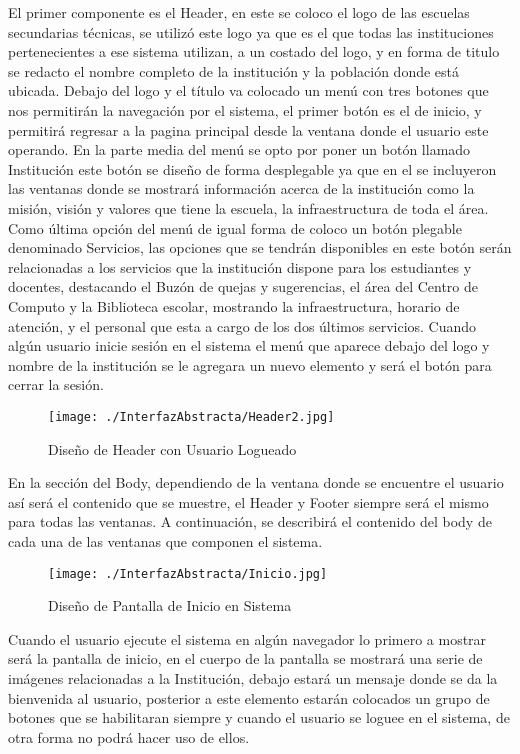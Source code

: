 {\large El primer componente es el Header, en este se coloco el logo de las escuelas secundarias técnicas, se utilizó este logo ya que es el que todas las instituciones pertenecientes a ese sistema utilizan, a un costado del logo, y en forma de titulo se redacto el nombre completo de la institución y la población donde está ubicada.
Debajo del logo y el título va colocado un menú con tres botones que nos permitirán la navegación por el sistema, el primer botón es el de inicio, y permitirá regresar a la pagina principal desde la ventana donde el usuario este operando. En la parte media del menú se opto por poner un botón llamado Institución este botón se diseño de forma desplegable ya que en el se incluyeron las ventanas donde se mostrará información acerca de la institución como la misión, visión y valores que tiene la escuela, la infraestructura de toda el área. Como última opción del menú de igual forma de coloco un botón plegable denominado Servicios, las opciones que se tendrán disponibles en este botón serán relacionadas a los servicios que la institución dispone para los estudiantes y docentes, destacando el Buzón de quejas y sugerencias, el área del Centro de Computo y la Biblioteca escolar, mostrando la infraestructura, horario de atención, y el personal que esta a cargo de los dos últimos servicios.
Cuando algún usuario inicie sesión en el sistema el menú que aparece debajo del logo y nombre de la institución se le agregara un nuevo elemento y será el botón para cerrar la sesión.}\\

\begin{figure}[H]
\centering
	\texttt{[image: ./InterfazAbstracta/Header2.jpg]}
	\caption{Diseño de Header con Usuario Logueado}	
\end{figure}

{\large En la sección del Body, dependiendo de la ventana donde se encuentre el usuario así será el contenido que se muestre, el Header y Footer siempre será el mismo para todas las ventanas. 
A continuación, se describirá el contenido del body de cada una de las ventanas que componen el sistema.}\\

\begin{figure}[H]
\centering
	\texttt{[image: ./InterfazAbstracta/Inicio.jpg]}
	\caption{Diseño de Pantalla de Inicio en Sistema}	
\end{figure}

{\large Cuando el usuario ejecute el sistema en algún navegador lo primero a mostrar será la pantalla de inicio, en el cuerpo de la pantalla se mostrará una serie de imágenes relacionadas a la Institución, debajo estará un mensaje donde se da la bienvenida al usuario, posterior a este elemento estarán colocados un grupo de botones que se habilitaran siempre y cuando el usuario se loguee en el sistema, de otra forma no podrá hacer uso de ellos.}\\

